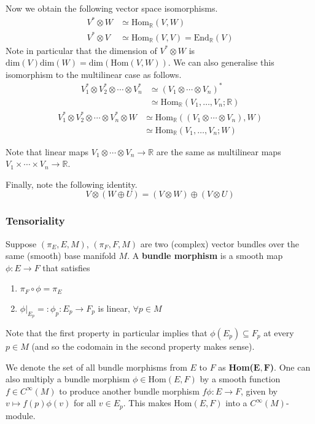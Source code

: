 \documentclass[a4paper]{article}
\theoremstyle{definition} \newtheorem*{definition}{Definition}
\theoremstyle{definition} \newtheorem*{definitions}{Definitions}
\theoremstyle{plain} \newtheorem{theorem}{Theorem}[section]
\theoremstyle{plain} \newtheorem{proposition}[theorem]{Proposition}
\theoremstyle{plain} \newtheorem{corollary}[theorem]{Corollary}
\theoremstyle{plain} \newtheorem{lemma}[theorem]{Lemma}
\theoremstyle{plain} \newtheorem{example}[theorem]{Example}
\newcommand{\defn}[1]{\textbf{#1}}
\newcommand{\realnos}{\mathbb{R}}
\newcommand{\Hom}{\text{Hom}}
\begin{document}
Now we obtain the following vector space isomorphisms.
\begin{align*}
V^*\otimes W & \simeq \Hom_\realnos(V, W) \\
V^*\otimes V & \simeq \Hom_\realnos(V, V) = \text{End}_\realnos (V) 
\end{align*}
Note in particular that the dimension of $V^*\otimes W$ is $\text{dim}(V)\text{dim}(W)=\text{dim}(\Hom(V, W))$. We can also generalise this isomorphism to the multilinear case as follows.
\begin{align*}
V_1^* \otimes V_2^* \otimes \cdots \otimes V_n^* & \simeq (V_1\otimes \cdots \otimes V_n)^* \\
& \simeq \Hom_\realnos (V_1, \ldots, V_n; \realnos) 
\end{align*}
\begin{align*}
V_1^* \otimes V_2^* \otimes \cdots \otimes V_n^* \otimes W & \simeq \Hom_\realnos((V_1\otimes \cdots \otimes V_n), W) \\
& \simeq \Hom_\realnos (V_1, \ldots, V_n; W) 
\end{align*}

Note that linear maps $V_1\otimes \cdots \otimes V_n\to \realnos$ are the same as multilinear maps $V_1\times \cdots \times V_n \to \realnos$.

Finally, note the following identity.
$$V\otimes (W\oplus U)=(V\otimes W)\oplus (V\otimes U)$$

\subsubsection{Tensoriality}
Suppose $(\pi_E, E, M)$, $(\pi_F, F, M)$ are two (complex) vector bundles over the same (smooth) base manifold $M$. A \defn{bundle morphism} is a smooth map $\phi:E\to F$ that satisfies
\begin{enumerate}
    \item $\pi_F\circ \phi = \pi_E$ 
    \item $\phi \vert_{E_p}=:\phi_p:E_p\to F_p$ is linear, $\forall p\in M$
\end{enumerate}
Note that the first property in particular implies that $\phi(E_p)\subseteq F_p$ at every $p\in M$ (and so the codomain in the second property makes sense).  

We denote the set of all bundle morphisms from $E$ to $F$ as \defn{Hom($\mathbf{E, F}$)}. One can also multiply a bundle morphism $\phi \in \text{Hom}(E, F)$ by a smooth function $f\in C^\infty (M)$ to produce another bundle morphism $f \phi :E\to F$,
given by $v\mapsto f(p)\phi(v)$ for all $v\in E_p$.  
This makes $\text{Hom}(E, F)$ into a $C^\infty(M)$-module.
\end{document}
